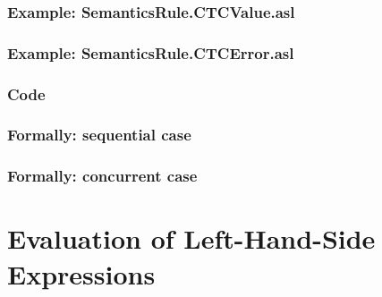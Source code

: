 \documentclass{book}
\begin{document}
  \subsection{Example: SemanticsRule.CTCValue.asl}

  \subsection{Example: SemanticsRule.CTCError.asl}

  \subsection{Code}

\begin{emptyformal}
  \subsection{Formally: sequential case}
  
  \subsection{Formally: concurrent case}
\end{emptyformal}



\chapter{Evaluation of Left-Hand-Side Expressions \label{chap:eval_lexpr}}
\end{document}
